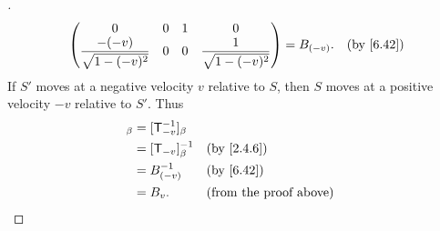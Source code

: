 \begin{proof}[]
\begin{align*}
\begin{pmatrix}
                   0                                & 0 & 1 & 0                                \\
                   \dfrac{-(-v)}{\sqrt{1 - (-v)^2}} & 0 & 0 & \dfrac{1}{\sqrt{1 - (-v)^2}}
                 \end{pmatrix} = B_{(-v)}. &  & \by{6.42}
  \end{align*}
  If \(S'\) moves at a negative velocity \(v\) relative to \(S\), then \(S\) moves at a positive velocity \(-v\) relative to \(S'\).
  Thus
  \begin{align*}
    [\T_v]_{\beta} & = [\T_{-v}^{-1}]_{\beta}                                    \\
                   & = [\T_{-v}]_{\beta}^{-1} &  & \by{2.4.6}                    \\
                   & = B_{(-v)}^{-1}          &  & \by{6.42}                     \\
                   & = B_v.                   &  & \text{(from the proof above)}
  \end{align*}
\end{proof}

\begin{ex}\label{ex:6.9.9}

\end{ex}
